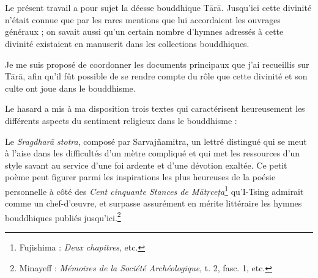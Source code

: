 \documentclass[a4paper, 11pt, oneside, french]{article}
\begin{document}
\section*{}
\paragraph{}
Le présent travail a pour sujet la déesse bouddhique T\={a}r\={a}. Jusqu'ici cette divinité n'était connue que par les rares mentions que lui accordaient les ouvrages généraux ; on savait aussi qu'un certain nombre d'hymnes adressés à cette divinité existaient en manuscrit dans les collections bouddhiques.

Je me suis proposé de coordonner les documents principaux que j'ai recueillis sur T\={a}r\={a}, afin qu'il fût possible de se rendre compte du rôle que cette divinité et son culte ont joue dans le bouddhisme.

Le hasard a mis à ma disposition trois textes qui caractérisent heureusement les différents aspects du sentiment religieux dans le bouddhisme :

Le \emph{Sragdhar\={a} stotra}, composé par Sarvaj\~{n}amitra, un lettré distingué qui se meut à l'aise dans les difficultés d'un mètre compliqué et qui met les ressources d'un style savant au service d'une foi ardente et d'une dévotion exaltée. Ce petit poème peut figurer parmi les inspirations les plus heureuses de la poésie personnelle à côté des \emph{Cent cinquante Stances de M\={a}t\d{r}ce\d{t}a}\footnote{Fujishima : \emph{Deux chapitres}, etc.} qu'I-Tsing admirait comme un chef-d'œuvre, et surpasse assurément en mérite littéraire les hymnes bouddhiques publiés jusqu'ici.\footnote{Minayeff : \emph{Mémoires de la Société Archéologique}, t. 2, fasc. 1, etc.}
\end{document}
